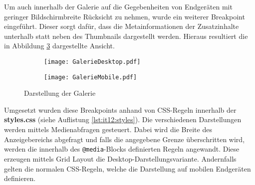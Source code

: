 Um auch innerhalb der Galerie auf die Gegebenheiten von Endgeräten mit geringer Bildschirmbreite Rücksicht zu nehmen, wurde ein weiterer Breakpoint eingeführt. Dieser sorgt dafür, dass die Metainformationen der Zusatzinhalte unterhalb statt neben des Thumbnails dargestellt werden. Hieraus resultiert die in Abbildung \ref{fig:GalerieDesktopMobile} dargestellte Ansicht.

\begin{figure}[h!]
\begin{subfigure}[c]{0.5\textwidth}
\texttt{[image: GalerieDesktop.pdf]}
\label{fig:GalerieDesktop}
\end{subfigure}%
\begin{subfigure}[c]{0.5\textwidth}
\texttt{[image: GalerieMobile.pdf]}
\label{fig:GalerieMobile}
\end{subfigure}
\caption{Darstellung der Galerie}
\label{fig:GalerieDesktopMobile}
\end{figure}

\FloatBarrier

Umgesetzt wurden diese Breakpoints anhand von CSS-Regeln innerhalb der \textbf{styles.css} (siehe Auflistung \ref{lst:it12:styles}). Die verschiedenen Darstellungen werden mittels Medienabfragen gesteuert. Dabei wird die Breite des Anzeigebereichs abgefragt und falls die angegebene Grenze überschritten wird, werden die innerhalb des \texttt{@media}-Blocks definierten Regeln angewandt. Diese  erzeugen mittels Grid Layout die Desktop-Darstellungsvariante. Andernfalls gelten die \glqq normalen\grqq{} CSS-Regeln, welche die Darstellung auf mobilen Endgeräten definieren.

